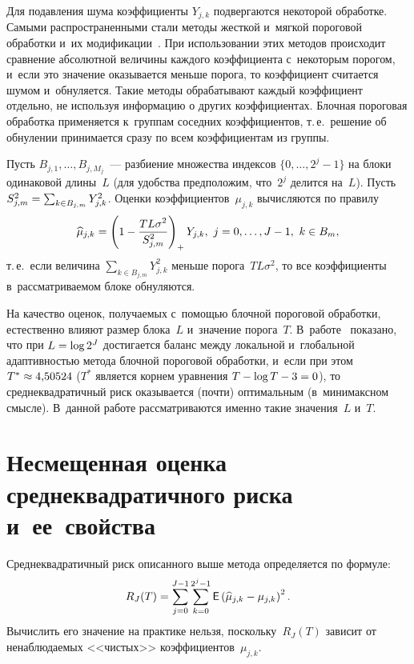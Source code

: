 \begin{multicols}{2}
Для подавления шума коэффициенты $Y_{j,k}$ подвергаются некоторой обработке. 
Самыми распространенными стали методы жесткой и~мягкой пороговой обработки и~их 
модификации~\cite{DonJ94, DonJ95, DonJ98, G98, PK05, LC10, HL10, HX15, ZC15}. 
При использовании этих методов происходит сравнение абсолютной величины каждого 
коэффициента с~некоторым порогом, и~если это значение оказывается меньше порога, то 
коэффициент считается шумом и~обнуляется. Такие методы обрабатывают каждый коэффициент 
отдельно, не используя информацию о других коэффициентах. Блочная пороговая обработка 
применяется к~группам соседних коэффициентов, т.\,е.\ решение об обнулении принимается сразу 
по всем коэффициентам из группы.

Пусть $B_{j,1},\ldots,B_{j,M_j}$~--- разбиение множества индексов $\{0,\ldots,2^j-1\}$ 
на блоки одинаковой длины~$L$ (для удобства предположим, что~$2^j$ делится на~$L$). Пусть 
$S^2_{j,m}\hm=\sum\nolimits_{k\in B_{j,m}}Y^2_{j,k}$. 
Оценки коэффициентов~$\mu_{j,k}$ вычисляются по правилу
\begin{equation*}
\widehat{\mu}_{j,k}=\left(1-\fr{TL\sigma^2}{S^2_{j,m}}\right)_+Y_{j,k},\ 
 j=0,\ldots,J-1,\ k\in B_m,
\end{equation*}
т.\,е.\ если величина $\sum\nolimits_{k\in B_{j,m}}Y^2_{j,k}$ меньше порога~$TL\sigma^2$, 
то все коэффициенты в~рассматриваемом блоке обнуляются.

На качество оценок, получаемых с~помощью блочной пороговой обработки, 
естественно влияют размер блока~$L$ и~значение порога~$T$. В~работе~\cite{Cai99} 
показано, что при $L\hm=\log 2^J$ достигается баланс между локальной и~глобальной 
адаптивностью метода блочной пороговой обработки, и~если при этом $T^*\hm\approx4{,}50524$ 
($T^*$ является корнем уравнения $T\hm-\log  T \hm-3\hm=0$), то среднеквадратичный риск 
оказывается (почти) оптимальным (в~минимаксном смысле). 
В~данной работе рассматриваются именно такие значения~$L$ и~$T$.


\section{Несмещенная оценка среднеквадратичного риска и~ее~свойства}

Среднеквадратичный риск описанного выше метода определяется по формуле:
\begin{equation*}
R_J(T)=\sum\limits_{j=0}^{J-1}\sum\limits_{k=0}^{2^j-1}{\sf E}\left(
\widehat{\mu}_{j,k}-\mu_{j,k}\right)^2.
\end{equation*}
Вычислить его значение на практике нельзя, поскольку~$R_J(T)$ зависит от 
ненаблюдаемых <<чистых>> коэффициентов~$\mu_{j,k}$.


\end{multicols}
